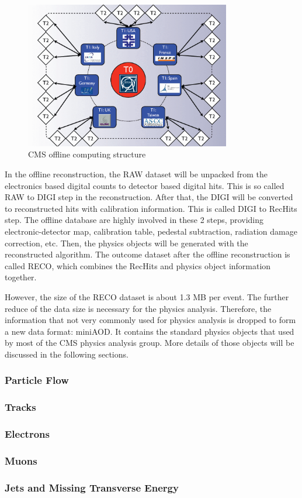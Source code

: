 \begin{figure}[htbp]
 \begin{center}
  \includegraphics[width=0.8\textwidth]{figures/c3/c3_cms_tiers.png}
 \end{center}
 \caption{CMS offline computing structure}
 \label{fig:c3cmstiers}
\end{figure}

In the offline reconstruction, the RAW dataset will be unpacked from the electronics based digital counts to detector based digital hits. This is so called RAW to DIGI step in the reconstruction. After that, the DIGI will be converted to reconstructed hits with calibration information. This is called DIGI to RecHits step. The offline database are highly involved in these 2 steps, providing electronic-detector map, calibration table, pedestal subtraction, radiation damage correction, etc. Then, the physics objects will be generated with the reconstructed algorithm. The outcome dataset after the offline reconstruction is called RECO, which combines the RecHits and physics object information together. 

However, the size of the RECO dataset is about 1.3 MB per event. The further reduce of the data size is necessary for the physics analysis. Therefore, the information that not very commonly used for physics analysis is dropped to form a new data format: miniAOD. It contains the standard physics objects that used by most of the CMS physics analysis group. More details of those objects will be discussed in the following sections. 

\subsubsection{Particle Flow}
\subsubsection{Tracks}
\subsubsection{Electrons}
\subsubsection{Muons}
\subsubsection{Jets and Missing Transverse Energy}

